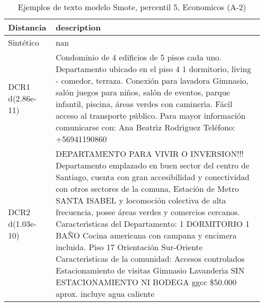 \begin{table}[H]
\centering
\fontsize{10}{14}\selectfont
\caption{Ejemplos de texto modelo Smote, percentil 5, Economicos (A-2)}
\label{table-example-economicos-a-2-smote-enc-5p-text}
\begin{tabular}{|l|m{35em}|}
\hline
\rowcolor[gray]{0.8}
Distancia & description \\
\hline Sintético & nan \\
\hline DCR1 d(2.86e-11) & Condominio de 4 edificios de 5 pisos cada uno. Departamento ubicado en el piso 4 1 dormitorio, living - comedor, terraza. Conexi\'on para lavadora Gimnasio, sal\'on juegos para ni\~nos, sal\'on de eventos, parque infantil, piscina, \'areas verdes con caminer{\'\i}a. F\'acil acceso al transporte p\'ublico.  Para mayor informaci\'on comunicarse con: Ana Beatr{\'\i}z Rodr{\'\i}guez Tel\'efono: +56941190860 \\
\hline DCR2 d(1.03e-10) & DEPARTAMENTO PARA VIVIR O INVERSION!!! Departamento emplazado en buen sector del centro de Santiago, cuenta con gran accesibilidad y conectividad con otros sectores de la comuna, Estaci\'on de Metro SANTA ISABEL y locomoci\'on colectiva de alta frecuencia, posee \'areas verdes y comercios cercanos.  Caracter{\'\i}sticas del Departamento:  1 DORMITORIO 1 BA\~NO Cocina americana con campana y encimera incluida. Piso 17 Orientaci\'on Sur-Oriente  Caracter{\'\i}sticas de la comunidad: Accesos controlados Estacionamiento de visitas Gimnasio Lavander{\'\i}a  SIN ESTACIONAMIENTO NI BODEGA ggcc \$50.000 aprox. incluye agua caliente \\
\hline
\end{tabular}
\end{table}
